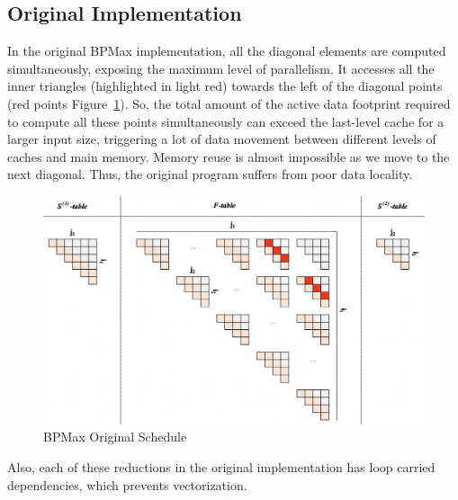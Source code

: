\subsection{Original Implementation} In the original BPMax implementation, all the diagonal elements are computed simultaneously, exposing the maximum level of parallelism. It accesses all the inner triangles  (highlighted in light red) towards the left of the diagonal points (red points Figure~\ref{fig:bpmax_original_schedule}). 
So, the total amount of the active data footprint required to compute all these points simultaneously can exceed the last-level cache for a larger input size, triggering a lot of data movement between different levels of caches and main memory. Memory reuse is almost impossible as we move to the next diagonal. Thus, the original program suffers from poor data locality.
\begin{figure}[htb]
\centerline{\includegraphics[scale=.30]{content/figures/bpmax_original_schedule.png}}
\caption{BPMax Original Schedule}
\label{fig:bpmax_original_schedule}
\end{figure}
Also, each of these reductions in the original implementation has loop carried dependencies, which prevents vectorization.

